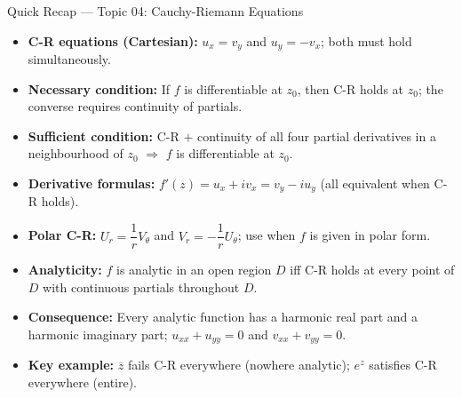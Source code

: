\documentclass[12pt,a4paper]{article}
\begin{document}
\begin{learnbox}{Quick Recap --- Topic 04: Cauchy-Riemann Equations}
\begin{itemize}[noitemsep]
  \item \textbf{C-R equations (Cartesian):} $u_x = v_y$ and $u_y = -v_x$; both must hold simultaneously.
  \item \textbf{Necessary condition:} If $f$ is differentiable at $z_0$, then C-R holds at $z_0$; the converse requires continuity of partials.
  \item \textbf{Sufficient condition:} C-R $+$ continuity of all four partial derivatives in a neighbourhood of $z_0$ $\Rightarrow$ $f$ is differentiable at $z_0$.
  \item \textbf{Derivative formulas:} $f'(z) = u_x + iv_x = v_y - iu_y$ (all equivalent when C-R holds).
  \item \textbf{Polar C-R:} $U_r = \dfrac{1}{r}V_\theta$ and $V_r = -\dfrac{1}{r}U_\theta$; use when $f$ is given in polar form.
  \item \textbf{Analyticity:} $f$ is analytic in an open region $D$ iff C-R holds at every point of $D$ with continuous partials throughout $D$.
  \item \textbf{Consequence:} Every analytic function has a harmonic real part and a harmonic imaginary part; $u_{xx}+u_{yy} = 0$ and $v_{xx}+v_{yy} = 0$.
  \item \textbf{Key example:} $\overline{z}$ fails C-R everywhere (nowhere analytic); $e^z$ satisfies C-R everywhere (entire).
\end{itemize}
\end{learnbox}
\end{document}

